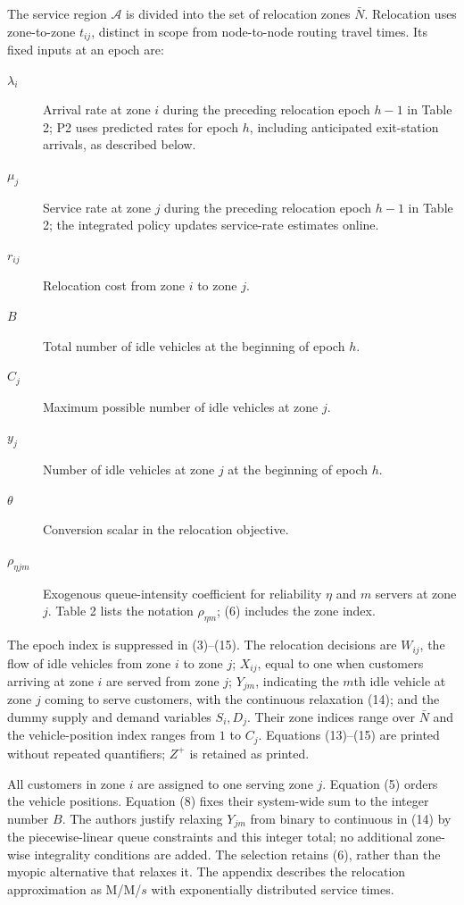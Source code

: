\documentclass{article}
\begin{document}
The service region $\mathcal A$ is divided into the set of relocation zones $\bar N$. Relocation uses zone-to-zone $t_{ij}$, distinct in scope from node-to-node routing travel times. Its fixed inputs at an epoch are:
\begin{description}
\item[$\lambda_i$] Arrival rate at zone $i$ during the preceding relocation epoch $h-1$ in Table 2; P2 uses predicted rates for epoch $h$, including anticipated exit-station arrivals, as described below.
\item[$\mu_j$] Service rate at zone $j$ during the preceding relocation epoch $h-1$ in Table 2; the integrated policy updates service-rate estimates online.
\item[$r_{ij}$] Relocation cost from zone $i$ to zone $j$.
\item[$B$] Total number of idle vehicles at the beginning of epoch $h$.
\item[$C_j$] Maximum possible number of idle vehicles at zone $j$.
\item[$y_j$] Number of idle vehicles at zone $j$ at the beginning of epoch $h$.
\item[$\theta$] Conversion scalar in the relocation objective.
\item[$\rho_{\eta jm}$] Exogenous queue-intensity coefficient for reliability $\eta$ and $m$ servers at zone $j$. Table 2 lists the notation $\rho_{\eta m}$; (6) includes the zone index.
\end{description}
The epoch index is suppressed in (3)--(15). The relocation decisions are $W_{ij}$, the flow of idle vehicles from zone $i$ to zone $j$; $X_{ij}$, equal to one when customers arriving at zone $i$ are served from zone $j$; $Y_{jm}$, indicating the $m$th idle vehicle at zone $j$ coming to serve customers, with the continuous relaxation (14); and the dummy supply and demand variables $S_i,D_j$. Their zone indices range over $\bar N$ and the vehicle-position index ranges from $1$ to $C_j$. Equations (13)--(15) are printed without repeated quantifiers; $Z^+$ is retained as printed.

All customers in zone $i$ are assigned to one serving zone $j$. Equation (5) orders the vehicle positions. Equation (8) fixes their system-wide sum to the integer number $B$. The authors justify relaxing $Y_{jm}$ from binary to continuous in (14) by the piecewise-linear queue constraints and this integer total; no additional zone-wise integrality conditions are added. The selection retains (6), rather than the myopic alternative that relaxes it. The appendix describes the relocation approximation as M/M/$s$ with exponentially distributed service times.
\end{document}
